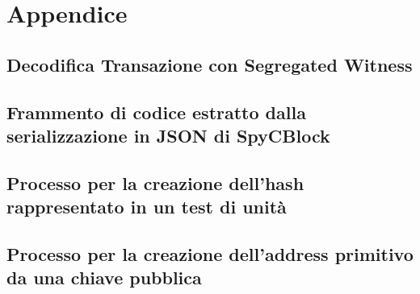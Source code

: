 \chapter{Appendice}
\label{app:appendixCode}


\section{Decodifica Transazione con Segregated Witness} \label{sec:decodeTransactionCode}



\section{Frammento di codice estratto dalla serializzazione in JSON di SpyCBlock} \label{sec:genesiBlockTxJSON}



\section{Processo per la creazione dell'hash rappresentato in un test di unità} \label{sec:genesiBlockTxJSON}



\section{Processo per la creazione dell'address primitivo da una chiave pubblica} \label{sec:buildAddressFromPubKey}


